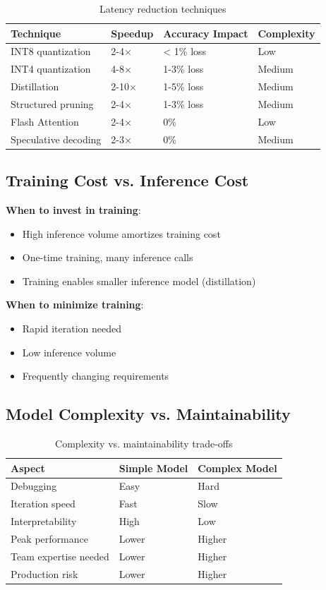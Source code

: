 \begin{table}[H]
\centering
\caption{Latency reduction techniques}
\begin{tabularx}{\textwidth}{lXXX}
\toprule
\textbf{Technique} & \textbf{Speedup} & \textbf{Accuracy Impact} & \textbf{Complexity} \\
\midrule
INT8 quantization & 2-4× & < 1\% loss & Low \\
INT4 quantization & 4-8× & 1-3\% loss & Medium \\
Distillation & 2-10× & 1-5\% loss & Medium \\
Structured pruning & 2-4× & 1-3\% loss & Medium \\
Flash Attention & 2-4× & 0\% & Low \\
Speculative decoding & 2-3× & 0\% & Medium \\
\bottomrule
\end{tabularx}
\end{table}

\subsection{Training Cost vs. Inference Cost}

\textbf{When to invest in training}:
\begin{itemize}
    \item High inference volume amortizes training cost
    \item One-time training, many inference calls
    \item Training enables smaller inference model (distillation)
\end{itemize}

\textbf{When to minimize training}:
\begin{itemize}
    \item Rapid iteration needed
    \item Low inference volume
    \item Frequently changing requirements
\end{itemize}

\subsection{Model Complexity vs. Maintainability}

\begin{table}[H]
\centering
\caption{Complexity vs. maintainability trade-offs}
\begin{tabularx}{\textwidth}{lXX}
\toprule
\textbf{Aspect} & \textbf{Simple Model} & \textbf{Complex Model} \\
\midrule
Debugging & Easy & Hard \\
Iteration speed & Fast & Slow \\
Interpretability & High & Low \\
Peak performance & Lower & Higher \\
Team expertise needed & Lower & Higher \\
Production risk & Lower & Higher \\
\bottomrule
\end{tabularx}
\end{table}


